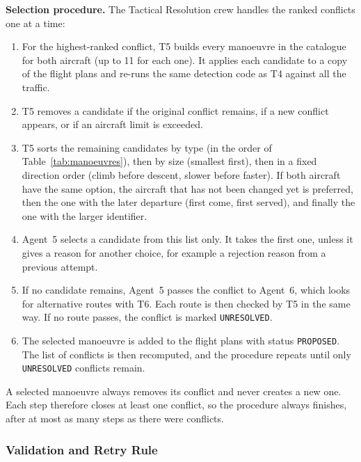 \textbf{Selection procedure.} The Tactical Resolution crew handles the ranked conflicts one at a time:
\begin{enumerate}
    \item For the highest-ranked conflict, T5 builds every manoeuvre in the catalogue for both aircraft (up to 11 for each one). It applies each candidate to a copy of the flight plans and re-runs the same detection code as T4 against all the traffic.
    \item T5 removes a candidate if the original conflict remains, if a new conflict appears, or if an aircraft limit is exceeded.
    \item T5 sorts the remaining candidates by type (in the order of Table~\ref{tab:manoeuvres}), then by size (smallest first), then in a fixed direction order (climb before descent, slower before faster). If both aircraft have the same option, the aircraft that has not been changed yet is preferred, then the one with the later departure (first come, first served), and finally the one with the larger identifier.
    \item Agent~5 selects a candidate from this list only. It takes the first one, unless it gives a reason for another choice, for example a rejection reason from a previous attempt.
    \item If no candidate remains, Agent~5 passes the conflict to Agent~6, which looks for alternative routes with T6. Each route is then checked by T5 in the same way. If no route passes, the conflict is marked \texttt{UNRESOLVED}.
    \item The selected manoeuvre is added to the flight plans with status \texttt{PROPOSED}. The list of conflicts is then recomputed, and the procedure repeats until only \texttt{UNRESOLVED} conflicts remain.
\end{enumerate}
A selected manoeuvre always removes its conflict and never creates a new one. Each step therefore closes at least one conflict, so the procedure always finishes, after at most as many steps as there were conflicts.

\subsubsection{Validation and Retry Rule}\label{sec:retry-rule}


